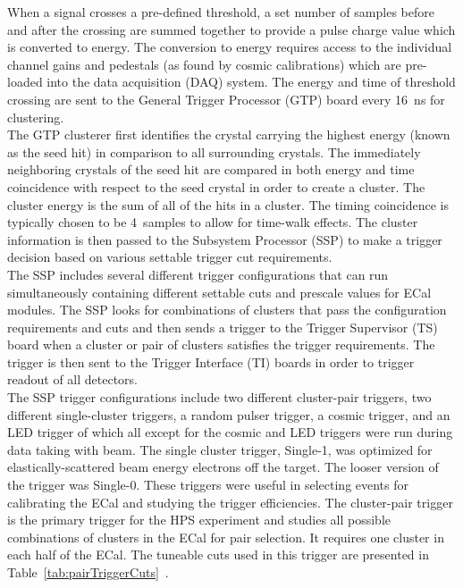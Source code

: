 When a signal crosses a pre-defined threshold, a set number of samples before and after the crossing are summed together to provide a pulse charge value which is converted to energy. The conversion to energy requires access to the individual channel gains and pedestals (as found by cosmic calibrations) which are pre-loaded into the data acquisition (DAQ) system. The energy and time of threshold crossing are sent to the General Trigger Processor (GTP) board every 16~ns  for clustering.~\cite{balossino_hps_2016}\\
\indent The GTP clusterer first identifies the crystal carrying the highest energy (known as the seed hit) in comparison to all surrounding crystals. The immediately neighboring crystals of the seed hit are compared in both energy and time coincidence with respect to the seed crystal in order to create a cluster. The cluster energy is the sum of all of the hits in a cluster. The timing coincidence is typically chosen to be 4~samples to allow for time-walk effects. The cluster information is then passed to the Subsystem Processor (SSP) to make a trigger decision based on various settable trigger cut requirements. \\
\indent The SSP includes several different trigger configurations that can run simultaneously containing different settable cuts and prescale values for ECal modules. The SSP looks for combinations of clusters that pass the configuration requirements and cuts and then sends a trigger to the Trigger Supervisor (TS) board when a cluster or pair of clusters satisfies the trigger requirements. The trigger is then sent to the Trigger Interface (TI) boards in order to trigger readout of all detectors.\\ 
\indent The SSP trigger configurations include two different cluster-pair triggers, two different single-cluster triggers, a random pulser trigger, a cosmic trigger, and an LED trigger of which all except for the cosmic and LED triggers were run during data taking with beam. The single cluster trigger, Single-1, was optimized for elastically-scattered beam energy electrons off the target. The looser version of the trigger was Single-0. These triggers were useful in selecting events for calibrating the ECal and studying the trigger efficiencies. The cluster-pair trigger is the primary trigger for the HPS experiment and studies all possible combinations of clusters in the ECal for pair selection. It requires one cluster in each half of the ECal. The tuneable cuts used in this trigger are presented in Table~\ref{tab:pairTriggerCuts}~\cite{balossino_hps_2016}. \\

